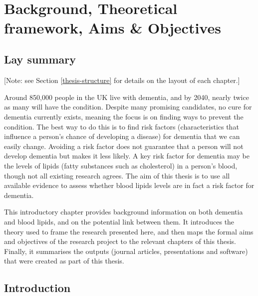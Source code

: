\documentclass[a4paper, twoside]{templates/ociamthesis}
\begin{document}
\hypertarget{section}{%
\subsection{}\label{section}}

~



\hypertarget{background-heading}{%
\chapter{Background, Theoretical framework, Aims \& Objectives}\label{background-heading}}

\minitoc 

\hypertarget{lay-summary}{%
\section{Lay summary}\label{lay-summary}}

{[}Note: see Section \ref{thesis-structure} for details on the layout of each chapter.{]}

Around 850,000 people in the UK live with dementia, and by 2040, nearly twice as many will have the condition. Despite many promising candidates, no cure for dementia currently exists, meaning the focus is on finding ways to prevent the condition. The best way to do this is to find risk factors (characteristics that influence a person's chance of developing a disease) for dementia that we can easily change. Avoiding a risk factor does not guarantee that a person will not develop dementia but makes it less likely. A key risk factor for dementia may be the levels of lipids (fatty substances such as cholesterol) in a person's blood, though not all existing research agrees. The aim of this thesis is to use all available evidence to assess whether blood lipids levels are in fact a risk factor for dementia.

This introductory chapter provides background information on both dementia and blood lipids, and on the potential link between them. It introduces the theory used to frame the research presented here, and then maps the formal aims and objectives of the research project to the relevant chapters of this thesis. Finally, it summarises the outputs (journal articles, presentations and software) that were created as part of this thesis.

\hypertarget{introduction}{%
\section{Introduction}\label{introduction}}
\end{document}
